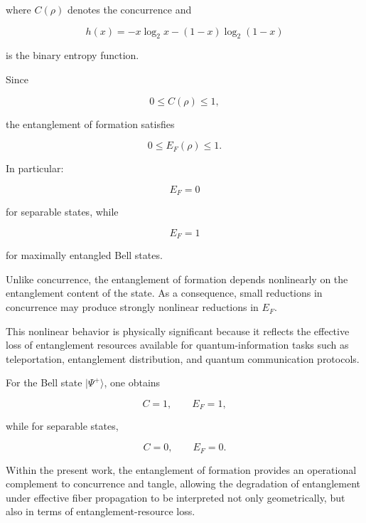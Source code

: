 where \( C(\rho) \) denotes the concurrence and

\begin{equation}
h(x)
=
-
x \log_2 x
-
(1-x)\log_2(1-x)
\label{eq:binary_entropy_function}
\end{equation}

is the binary entropy function.

\medskip

Since

\[
0
\leq
C(\rho)
\leq
1,
\]

the entanglement of formation satisfies

\[
0
\leq
E_F(\rho)
\leq
1.
\]

In particular:

\[
E_F
=
0
\]

for separable states, while

\[
E_F
=
1
\]

for maximally entangled Bell states.

\medskip

Unlike concurrence, the entanglement of formation depends nonlinearly on the entanglement content of the state. As a consequence, small reductions in concurrence may produce strongly nonlinear reductions in \( E_F \).

\medskip

This nonlinear behavior is physically significant because it reflects the effective loss of entanglement resources available for quantum-information tasks such as teleportation, entanglement distribution, and quantum communication protocols.

\medskip

For the Bell state \( |\Psi^+\rangle \), one obtains

\[
C
=
1,
\qquad
E_F
=
1,
\]

while for separable states,

\[
C
=
0,
\qquad
E_F
=
0.
\]

\medskip

Within the present work, the entanglement of formation provides an operational complement to concurrence and tangle, allowing the degradation of entanglement under effective fiber propagation to be interpreted not only geometrically, but also in terms of entanglement-resource loss.


